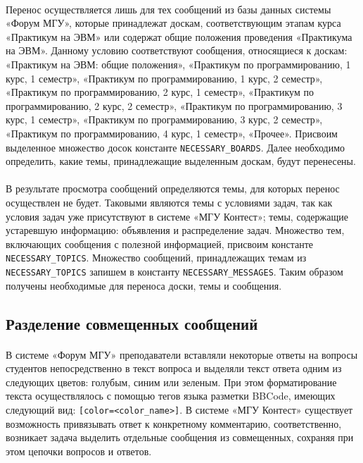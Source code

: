 \documentclass[12pt, a4paper, oneside]{article}
\begin{document}
\paragraph{}
Перенос осуществляется лишь для тех сообщений из базы данных системы «Форум МГУ», которые принадлежат доскам, соответствующим этапам курса «Практикум на ЭВМ» или содержат общие положения проведения «Практикума на ЭВМ». Данному условию соответствуют сообщения, относящиеся к доскам: «Практикум на ЭВМ: общие положения», «Практикум по программированию, 1 курс, 1 семестр», «Практикум по программированию, 1 курс, 2 семестр», «Практикум по программированию, 2 курс, 1 семестр», «Практикум по программированию, 2 курс, 2 семестр», «Практикум по программированию, 3 курс, 1 семестр», «Практикум по программированию, 3 курс, 2 семестр», «Практикум по программированию, 4 курс, 1 семестр», «Прочее». Присвоим выделенное множество досок константе \texttt{NECESSARY\_BOARDS}. Далее необходимо определить, какие темы, принадлежащие выделенным доскам, будут перенесены.
\paragraph{}
В результате просмотра сообщений определяются темы, для которых перенос осуществлен не будет. Таковыми являются темы с условиями задач, так как условия задач уже присутствуют в системе «МГУ Контест»; темы, содержащие устаревшую информацию: объявления и распределение задач. Множество тем, включающих сообщения с полезной информацией, присвоим константе \texttt{NECESSARY\_TOPICS}. Множество сообщений, принадлежащих темам из \texttt{NECESSARY\_TOPICS} запишем в константу \texttt{NECESSARY\_MESSAGES}. Таким образом получены необходимые для переноса доски, темы и сообщения.
\vspace{1cm}

\subsection{Разделение совмещенных сообщений}
\paragraph{}
В системе «Форум МГУ» преподаватели вставляли некоторые ответы на вопросы студентов непосредственно в текст вопроса и выделяли текст ответа одним из следующих цветов: голубым, синим или зеленым. При этом форматирование текста осуществлялось с помощью тегов языка разметки BBCode, имеющих следующий вид: \texttt{[color=<color\_name>]}. В системе «МГУ Контест» существует возможность привязывать ответ к конкретному комментарию, соответственно, возникает задача выделить отдельные сообщения из совмещенных, сохраняя при этом цепочки вопросов и ответов.
\end{document}
